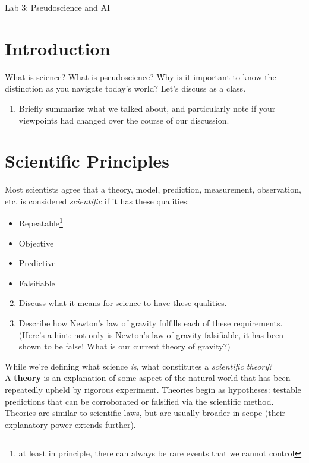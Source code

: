 \documentclass[12pt]{article}
\newcommand{\labnumber}{3}
\begin{document}
\thispagestyle{empty}
 \begin{center}
\LARGE Lab \labnumber: Pseudoscience and AI \\
\end{center} 

\section{Introduction}
What is science? What is pseudoscience? Why is it important to know the distinction as you navigate today's world? Let's discuss as a class. \begin{enumerate}
    \item Briefly summarize what we talked about, and particularly note if your viewpoints had changed over the course of our discussion. 
\end{enumerate}

\section{Scientific Principles}
Most scientists agree that a theory, model, prediction, measurement, observation, etc. is considered \textit{scientific} if it has these qualities:
\begin{itemize}
\item Repeatable\footnote{at least in principle, there can always be rare events that we cannot control}
\item Objective
\item Predictive
\item Falsifiable
\end{itemize}

\begin{enumerate}
\setcounter{enumi}{1}
    \item Discuss what it means for science to have these qualities.
    \item Describe how Newton's law of gravity fulfills each of these requirements. (Here's a hint: not only is Newton's law of gravity falsifiable, it has been shown to be false! What is our current theory of gravity?)
\end{enumerate} 
\noindent While we're defining what science \textit{is}, what constitutes a \textit{scientific theory}?\\

A \textbf{theory} is an explanation of some aspect of the natural world that has been repeatedly upheld by rigorous experiment. Theories begin as hypotheses: testable predictions that can be corroborated or falsified via the scientific method. Theories are similar to scientific laws, but are usually broader in scope (their explanatory power extends further).
\end{document}

